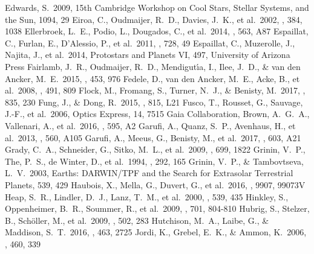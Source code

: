\documentclass[twocolumn,tighten]{aastex61}
\begin{document}
\begin{thebibliography}{}
 Edwards, S.\ 2009, 15th Cambridge Workshop on Cool Stars, Stellar Systems, and the Sun, 1094, 29
 Eiroa, C., Oudmaijer, R.~D., Davies, J.~K., et al.\ 2002, \aap, 384, 1038
 Ellerbroek, L.~E., Podio, L., Dougados, C., et al.\ 2014, \aap, 563, A87
 Espaillat, C., Furlan, E., D'Alessio, P., et al.\ 2011, \apj, 728, 49
 Espaillat, C., Muzerolle, J., Najita, J., et al.\ 2014, Protostars and Planets VI, 497, University of Arizona Press
 Fairlamb, J.~R., Oudmaijer, R.~D., Mendigut{\'{\i}}a, I., Ilee, J.~D., \& van den Ancker, M.~E.\ 2015, \mnras, 453, 976
 Fedele, D., van den Ancker, M.~E., Acke, B., et al.\ 2008, \aap, 491, 809
 Flock, M., Fromang, S., Turner, N.~J., \& Benisty, M.\ 2017, \apj, 835, 230
 Fung, J., \& Dong, R.\ 2015, \apjl, 815, L21
 Fusco, T., Rousset, G., Sauvage, J.-F., et al.\ 2006, Optics Express, 14, 7515
 Gaia Collaboration, Brown, A.~G.~A., Vallenari, A., et al.\ 2016, \aap, 595, A2
 Garufi, A., Quanz, S.~P., Avenhaus, H., et al.\ 2013, \aap, 560, A105
 Garufi, A., Meeus, G., Benisty, M., et al.\ 2017, \aap, 603, A21
 Grady, C.~A., Schneider, G., Sitko, M.~L., et al.\ 2009, \apj, 699, 1822
 Grinin, V.~P., The, P.~S., de Winter, D., et al.\ 1994, \aap, 292, 165
 Grinin, V.~P., \& Tambovtseva, L.~V.\ 2003, Earths: DARWIN/TPF and the Search for Extrasolar Terrestrial Planets, 539, 429
 Haubois, X., Mella, G., Duvert, G., et al.\ 2016, \procspie, 9907, 99073V
 Heap, S.~R., Lindler, D.~J., Lanz, T.~M., et al.\ 2000, \apj, 539, 435 
 Hinkley, S., Oppenheimer, B.~R., Soummer, R., et al.\ 2009, \apj, 701, 804-810
 Hubrig, S., Stelzer, B., Sch{\"o}ller, M., et al.\ 2009, \aap, 502, 283
 Hutchison, M.~A., Laibe, G., \& Maddison, S.~T.\ 2016, \mnras, 463, 2725
 Jordi, K., Grebel, E.~K., \& Ammon, K.\ 2006, \aap, 460, 339

\end{thebibliography}
\end{document}
